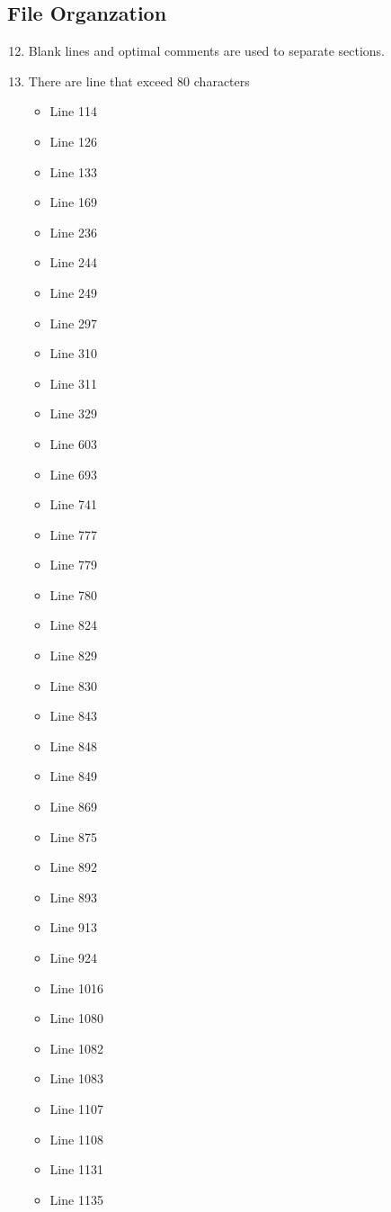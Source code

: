\subsection{File Organzation}
\begin{enumerate}
	\setcounter{enumi}{11}
	\item Blank lines and optimal comments are used to separate sections.
	\item There are line that exceed 80 characters
	\begin{itemize}
		\item Line 114
		\item Line 126
		\item Line 133
		\item Line 169
		\item Line 236
		\item Line 244
		\item Line 249
		\item Line 297
		\item Line 310
		\item Line 311
		\item Line 329
		\item Line 603
		\item Line 693
		\item Line 741
		\item Line 777
		\item Line 779
		\item Line 780
		\item Line 824
		\item Line 829
		\item Line 830
		\item Line 843
		\item Line 848
		\item Line 849
		\item Line 869
		\item Line 875
		\item Line 892
		\item Line 893
		\item Line 913
		\item Line 924
		\item Line 1016
		\item Line 1080
		\item Line 1082
		\item Line 1083
		\item Line 1107
		\item Line 1108
		\item Line 1131
		\item Line 1135

\end{itemize}
\end{enumerate}
